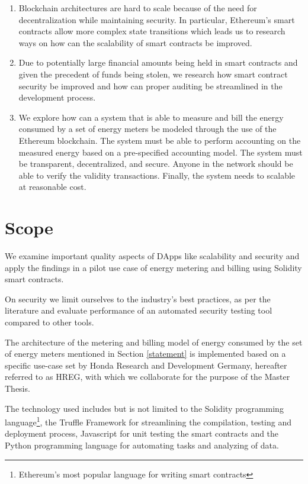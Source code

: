 \begin{enumerate}\label{statement}
    \item Blockchain architectures are hard to scale because of the need for decentralization while maintaining security. In particular, Ethereum's smart contracts allow more complex state transitions which leads us to research ways on how can the scalability of smart contracts be improved.
    \item Due to potentially large financial amounts being held in smart contracts and given the precedent of funds being stolen, we research how smart contract security be improved and how can proper auditing be streamlined in the development process.
    \item We explore how can a system that is able to measure and bill the energy consumed by a set of energy meters be modeled through the use of the Ethereum blockchain. The system must be able to perform accounting on the measured energy based on a pre-specified accounting model. The system must be transparent, decentralized, and secure. Anyone in the network should be able to verify the validity transactions. Finally, the system needs to scalable at reasonable cost.
\end{enumerate}

\section{Scope}
We examine important quality aspects of DApps like scalability and security and apply the findings in a pilot use case of energy metering and billing using Solidity smart contracts. 


On security we limit ourselves to the industry's best practices, as per the literature and evaluate performance of an automated security testing tool compared to other tools.

The architecture of the metering and billing model of energy consumed by the set of energy meters mentioned in Section \ref{statement} is implemented based on a specific use-case set by Honda Research and Development Germany, hereafter referred to as HREG, with which we collaborate for the purpose of the Master Thesis.

The technology used includes but is not limited to the Solidity programming language\footnote{Ethereum's most popular language for writing smart contracts}, the Truffle Framework for streamlining the compilation, testing and deployment process, Javascript for unit testing the smart contracts and the Python programming language for automating tasks and analyzing of data.

